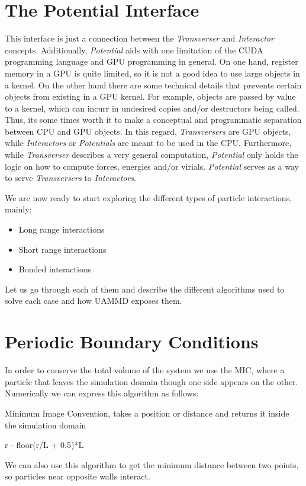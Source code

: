 \documentclass[ twoside,openright,titlepage,numbers=noenddot,%
headinclude,footinclude,cleardoublepage=empty,abstract=on,
BCOR=5mm,paper=a4,fontsize=11pt, dvipsnames
]{scrreprt}
\newcommand{\uammd}{\gls{UAMMD}\xspace}
\newcommand{\gpu}{\gls{GPU}\xspace}
\begin{document}
\section{The Potential Interface} \label{sec:potential}

This interface is just a connection between the \emph{Transverser} and \emph{Interactor} concepts. Additionally, \emph{Potential} aids with one limitation of the CUDA programming language and \gls{GPU} programming in general. On one hand, register memory in a \gpu is quite limited, so it is not a good idea to use large objects in a kernel. On the other hand there are some technical details that prevents certain objects from existing in a \gpu kernel. For example, objects are passed by value to a kernel, which can incurr in undesired copies and/or destructors being called. Thus, its some times worth it to make a conceptual and programmatic separation between CPU and \gpu objects.
In this regard, \emph{Transversers} are \gpu objects, while \emph{Interactors} or \emph{Potentials} are meant to be used in the CPU.
Furthermore, while \emph{Transverser} describes a very general computation, \emph{Potential} only holds the logic on how to compute forces, energies and/or virials.
\emph{Potential} serves as a way to serve \emph{Transversers} to \emph{Interactors}.


We are now ready to start exploring the different types of particle interactions, mainly:
\begin{itemize}
\item Long range interactions
\item Short range interactions
\item Bonded interactions
\end{itemize}

Let us go through each of them and describe the different algorithms used to solve each case and how \uammd exposes them.


\section{Periodic Boundary Conditions} 
In order to conserve the total volume of the system we use the \gls{MIC}, where a particle that leaves the simulation domain though one side appears on the other.
Numerically we can express this algorithm as follows:

\begin{algorithm}
  \caption{Minimum Image Convention, takes a position or distance and returns it inside the simulation domain}
  \begin{algorithmic}[1]
    \State \Return r - floor(r/L + 0.5)*L
    \EndFunction
  \end{algorithmic}
\end{algorithm}
We can also use this algorithm to get the minimum distance between two points, so particles near opposite walls interact.
\end{document}
